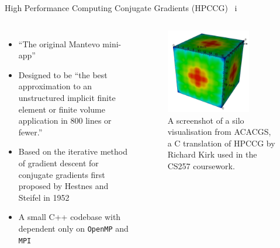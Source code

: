 \documentclass[10pt,aspectratio=169]{beamer}
\begin{document}
\begin{frame}{High Performance Computing Conjugate Gradients (HPCCG) \ i}
    \begin{columns}[T,onlytextwidth]
            \begin{itemize}
                \vspace{0.25cm}
                \item ``The original Mantevo mini-app'' \cite{MantevoHPCCG2023}
                \vspace{0.5cm}
                \item Designed to be ``the best approximation to an unstructured implicit finite element or finite volume application in 800 lines or fewer.'' \cite{heroux2013mantevo}
                \item Based on the iterative method of gradient descent for conjugate gradients first proposed by Hestnes and Steifel in 1952 \cite{hestenesMethodsConjugateGradients1952}
                \item A small C++ codebase with dependent only on \texttt{OpenMP} and \texttt{MPI}
            \end{itemize}
            \hspace{1cm}
            \begin{figure}[H]
                \includegraphics[width=0.75\textwidth]{images/acacgs_silo_output.png}
                \captionsetup{width=.9\linewidth}
                \caption{A screenshot of a silo visualisation from ACACGS, a C translation of HPCCG by Richard Kirk used in the CS257 coursework.}
                \label{fig:warwick_mantevo_link}
            \end{figure}
    \end{columns}
\end{frame}
\end{document}
